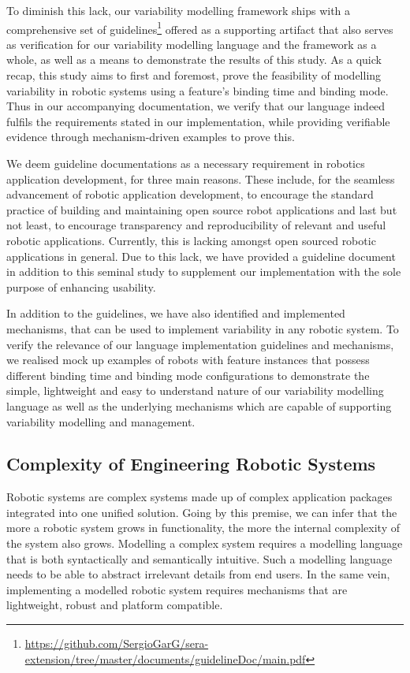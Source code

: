 \documentclass[conference]{IEEEtran}
\newcommand{\foot}[1]{\footnote{\url{#1}}}
\begin{document}
To diminish this lack, our variability modelling framework ships with a comprehensive set of guidelines\foot{https://github.com/SergioGarG/sera-extension/tree/master/documents/guidelineDoc/main.pdf}
offered as a supporting artifact that also serves as verification for our variability modelling language and the framework as a whole, as well as a means to demonstrate the results of this study. As a quick recap, this study aims to first and foremost, prove the feasibility of modelling variability in robotic systems using a feature's binding time and binding mode.  Thus in our accompanying documentation, we verify that our language indeed fulfils the requirements stated in our implementation, while providing verifiable evidence through mechanism-driven examples to prove this.

We deem guideline documentations as a necessary requirement in robotics application development, for three main reasons. These include, for the seamless advancement of robotic application development, to encourage the standard practice of building and maintaining open source robot applications and last but not least, to encourage transparency and reproducibility of relevant and useful robotic applications. Currently, this is lacking amongst open sourced robotic applications in general. Due to this lack, we have provided a guideline document  in addition to this seminal study to supplement our implementation with the sole purpose of enhancing usability.

In addition to the guidelines, we have also identified and implemented mechanisms, that can be used to implement variability in any robotic system. To verify the relevance of our language implementation guidelines and mechanisms, we realised mock up examples of robots with feature instances that possess different binding time and binding mode configurations to demonstrate the simple, lightweight and easy to understand nature of our variability modelling language as well as the underlying mechanisms which are capable of supporting variability modelling and management.

\subsection{Complexity of Engineering Robotic Systems}
Robotic systems are complex systems made up of complex application packages integrated into one unified solution. Going by this premise, we can infer that the more a robotic system grows in functionality, the more the internal complexity of the system also grows. Modelling a complex system requires a modelling language that is both syntactically and semantically intuitive. Such a modelling language needs to be able to abstract irrelevant details from end users. In the same vein, implementing a modelled robotic system requires mechanisms that are lightweight, robust and platform compatible.
\end{document}
